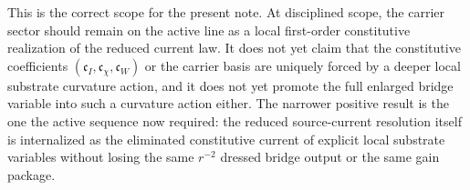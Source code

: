 \documentclass[11pt]{article}
\begin{document}
This is the correct scope for the present note. At disciplined scope, the carrier sector should remain on the active line as a local first-order constitutive realization of the reduced current law. It does not yet claim that the constitutive coefficients \((\mathfrak c_I,\mathfrak c_\chi,\mathfrak c_W)\) or the carrier basis are uniquely forced by a deeper local substrate curvature action, and it does not yet promote the full enlarged bridge variable into such a curvature action either. The narrower positive result is the one the active sequence now required: the reduced source-current resolution itself is internalized as the eliminated constitutive current of explicit local substrate variables without losing the same \(r^{-2}\) dressed bridge output or the same gain package.
\end{document}
